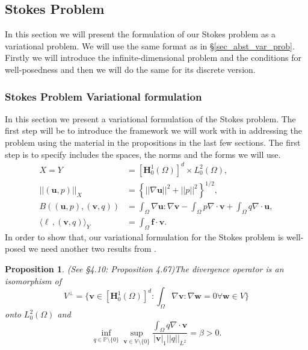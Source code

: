 \documentclass[12pt,a4paper]{article}
\newtheorem{proposition}[theorem]{Proposition}
\theoremstyle{definition}
\begin{document}
\subsection{Stokes Problem}
In this section we will present the formulation of our Stokes problem as a variational problem.  We will use the same format as in \S \ref{sec_abst_var_prob}.  Firstly we will introduce the infinite-dimensional problem and the conditions for well-posedness and then we will do the same for its discrete version.  
\subsubsection{Stokes Problem Variational formulation}
In this section we present a variational formulation of the Stokes problem.  The first step will be to introduce the framework we will work with in addressing the problem using the material in the propositions in the last few sections.  The first step is to specify includes the spaces, the norms and the forms we will use.
\begin{equation}\label{verf_eqns}
\begin{aligned}
X=Y&=\left[\textbf{H}^1_0\left(\Omega\right)\right]^d\times L^2_0\left(\Omega\right),\\
\left|\left|\left(\textbf{u},p\right)\right|\right|_X&=\left\lbrace \left|\left|\nabla\textbf{u}\right|\right|^2 + \left|\left|p\right|\right|^2\right\rbrace^{1/2},\\
B\left(\left(\textbf{u},p\right),\left(\textbf{v},q\right)\right)&=\int_{\Omega}\nabla \textbf{u} : \nabla \textbf{v} - \int_{\Omega} p \nabla\cdot\textbf{v} + \int_{\Omega} q \nabla\cdot\textbf{u},\\
\langle \ell\,,\left(\textbf{v},q\right) \rangle_Y &= \int_{\Omega}\textbf{f}\cdot \textbf{v}.
\end{aligned}
\end{equation}
In order to show that, our variational formulation for the Stokes problem is well-posed we need another two results from \cite{verfurth2013posteriori}.
\begin{proposition}(See \cite{verfurth2013posteriori} \S 4.10: Proposition 4.67)\label{prop_well_pos_verf_saddle_1}
	The divergence  operator is an isomorphism of 
	\begin{equation}
		V^{\perp} =\lbrace \textbf{v}\in \left[\textbf{H}^1_0\left(\Omega\right)\right]^d: \int_{\Omega}\nabla\textbf{v}:\nabla\textbf{w}=0 \forall \textbf{w}\in V \rbrace\nonumber
	\end{equation}
	onto $L^2_0\left(\Omega\right)$ and
	\begin{equation}\label{verf_infsup_q}
	\inf_{q\in \mathbb{P}\setminus \lbrace 0 \rbrace}\sup_{\textbf{v}\in \mathbb{V}\setminus \lbrace 0 \rbrace}\frac{\int_{\Omega}q\nabla\cdot\textbf{v}}{\left|\textbf{v}\right|_1 \left|\left|q\right|\right|_{L^2}}=\beta>0.\nonumber
	\end{equation}
\end{proposition}
\end{document}
